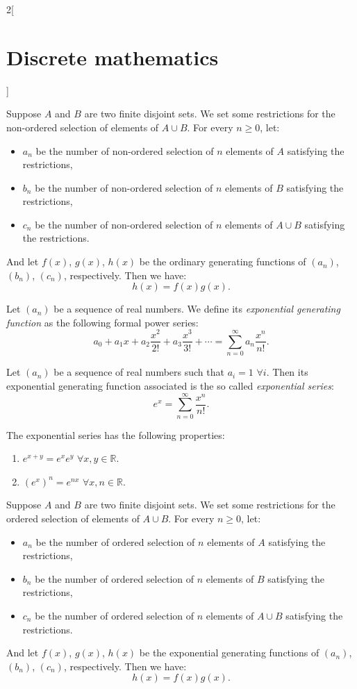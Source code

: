 \documentclass[../../../main.tex]{subfiles}
\begin{document}
\begin{multicols}{2}[\section{Discrete mathematics}]
\begin{prop}
Suppose $A$ and $B$ are two finite disjoint sets. We set some restrictions for the non-ordered selection of elements of $A\cup B$. For every $n\geq 0$, let:
\begin{itemize}
    \item $a_n$ be the number of non-ordered selection of $n$ elements of $A$ satisfying the restrictions,
    \item $b_n$ be the number of non-ordered selection of $n$ elements of $B$ satisfying the restrictions,
    \item $c_n$ be the number of non-ordered selection of $n$ elements of $A\cup B$ satisfying the restrictions.
\end{itemize}
And let $f(x)$, $g(x)$, $h(x)$ be the ordinary generating functions of $(a_n)$, $(b_n)$, $(c_n)$, respectively. Then we have: $$h(x)=f(x)g(x).$$
\end{prop}
\begin{definition}
Let $(a_n)$ be a sequence of real numbers. We define its \textit{exponential generating function} as the following formal power series: $$a_0+a_1x+a_2\frac{x^2}{2!}+a_3\frac{x^3}{3!}+\cdots=\sum_{n=0}^\infty a_n\frac{x^n}{n!}.$$
\end{definition}
\begin{definition}
Let $(a_n)$ be a sequence of real numbers such that $a_i=1$ $\forall i$. Then its exponential generating function associated is the so called \textit{exponential series}: $$e^x=\sum_{n=0}^\infty \frac{x^n}{n!}.$$
\end{definition}
\begin{prop}
The exponential series has the following properties:
\begin{enumerate}
    \item $e^{x+y}=e^xe^y$ $\forall x,y\in\mathbb{R}$.
    \item $(e^x)^n=e^{nx}$ $\forall x,n\in\mathbb{R}$.
\end{enumerate}
\end{prop}
\begin{prop}
Suppose $A$ and $B$ are two finite disjoint sets. We set some restrictions for the ordered selection of elements of $A\cup B$. For every $n\geq 0$, let:
\begin{itemize}
    \item $a_n$ be the number of ordered selection of $n$ elements of $A$ satisfying the restrictions,
    \item $b_n$ be the number of ordered selection of $n$ elements of $B$ satisfying the restrictions,
    \item $c_n$ be the number of ordered selection of $n$ elements of $A\cup B$ satisfying the restrictions.
\end{itemize}
And let $f(x)$, $g(x)$, $h(x)$ be the exponential generating functions of $(a_n)$, $(b_n)$, $(c_n)$, respectively. Then we have: $$h(x)=f(x)g(x).$$
\end{prop}

\end{multicols}
\end{document}
